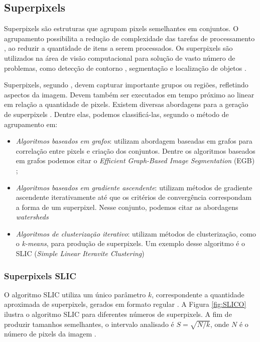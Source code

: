 \begin{document}
\subsection{Superpixels} \label{ssec:super}

Superpixels são estruturas que agrupam pixels semelhantes em conjuntos. O agrupamento possibilita a redução de complexidade das tarefas de processamento \cite{SLIC}, ao reduzir a quantidade de itens a serem processados. Os superpixels são utilizados na área de visão computacional para solução de vasto número de problemas, como detecção de contorno \cite{CONTOUR}, segmentação \cite{SEG_MERGE} e localização de objetos \cite{SEG_LOCALIZ}.

Superpixels, segundo \cite{FELZENSZWALB}, devem capturar importante grupos ou regiões, refletindo aspectos da imagem. Devem também ser executados em tempo próximo ao linear em relação a quantidade de pixels. Existem diversas abordagens para a geração de superpixels \cite{SLIC}. Dentre elas, podemos classificá-las, segundo o método de agrupamento em: 

\begin{itemize}
 \item \textit{Algoritmos baseados em grafos}: utilizam abordagem baseadas em grafos para correlação entre pixels e criação dos conjuntos. Dentre os algoritmos baseados em grafos podemos citar o \textit{Efficient Graph-Based Image Segmentation} (EGB) \cite{FELZENSZWALB};
 \item \textit{Algoritmos baseados em gradiente ascendente}: utilizam métodos de gradiente ascendente iterativamente até que os critérios de convergência correspondam a forma de um superpixel. Nesse conjunto, podemos  citar as abordagens \textit{watersheds} \cite{WATERSHEDS} \cite{SLIC}
 \item \textit{Algoritmos de clusterização iterativo}: utilizam métodos de clusterização, como o \textit{k-means}, para produção de superpixels. Um exemplo desse algoritmo é o SLIC (\textit{Simple Linear Iteravite Clustering}) \cite{SLIC}
\end{itemize}


\subsubsection{Superpixels SLIC} \label{sssec:slic}

O algoritmo SLIC utiliza um único parâmetro $k$, correspondente a quantidade aproximada de superpixels, gerados em formato regular \cite{SLIC}. A Figura \ref{fig:SLICO} ilustra o algoritmo SLIC para diferentes números de superpixels. A fim de produzir tamanhos semelhantes, o intervalo analisado é \mbox{$S=\sqrt{N/k}$}, onde $N$ é o número de pixels da imagem \cite{SLIC}. 
\end{document}
